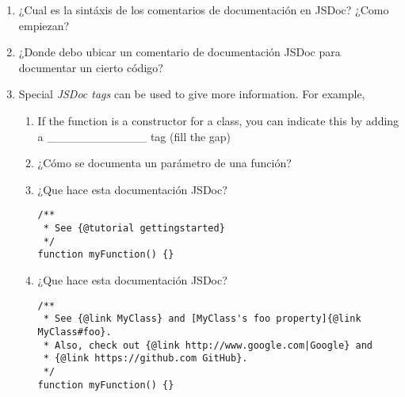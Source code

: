 \begin{enumerate}
\def\labelenumi{\arabic{enumi}.}
\itemsep1pt\parskip0pt
\item
  ¿Cual es la sintáxis de los comentarios de documentación en JSDoc?
  ¿Como empiezan?
\item
  ¿Donde debo ubicar un comentario de documentación JSDoc para
  documentar un cierto código?
\item
  Special \emph{JSDoc tags} can be used to give more information. For
  example,

  \begin{enumerate}
  \def\labelenumii{\arabic{enumii}.}
  \item
    If the function is a constructor for a class, you can indicate this
    by adding a \_\_\_\_\_\_\_\_\_\_\_\_ tag (fill the gap)
  \item
    ¿Cómo se documenta un parámetro de una función?
  \item
    ¿Que hace esta documentación JSDoc?

\begin{verbatim}
/**
 * See {@tutorial gettingstarted} 
 */
function myFunction() {}
\end{verbatim}
  \item
    ¿Que hace esta documentación JSDoc?

\begin{verbatim}
/**
 * See {@link MyClass} and [MyClass's foo property]{@link MyClass#foo}.
 * Also, check out {@link http://www.google.com|Google} and
 * {@link https://github.com GitHub}.
 */
function myFunction() {}
\end{verbatim}
  \end{enumerate}
\end{enumerate}

